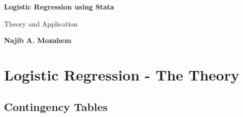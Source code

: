 \documentclass[a4paper,12pt,oneside]{book}
\begin{document}
\begin{titlepage}
    \begin{center}
        \vspace*{1cm}
 
        \Huge
        \textbf{Logistic Regression using Stata}
 
        \vspace{0.5cm}
        \LARGE
        Theory and Application
 
        \vspace{1.5cm}
 
        \textbf{Najib A. Mozahem}
 
        \vfill
 
        \vspace{0.8cm}
 
    \end{center}
\end{titlepage}
\tableofcontents
\chapter{Logistic Regression - The Theory}
\section{Contingency Tables}
\end{document}
